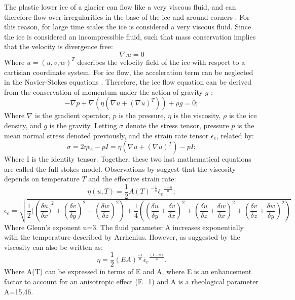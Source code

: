 \documentclass{article}
\begin{document}
The plastic lower ice of a glacier can flow like a very viscous fluid, and can therefore flow over irregularities in the base of the ice and around corners \cite{earle2015physical}. For this reason, for large time scales the ice is considered a very viscous fluid. Since the ice is considered an incompressible fluid, such that mass conservation implies that the velocity is divergence free:
\begin{equation}
	\nabla .u=0
\end{equation}
Where $u=(u,v,w)^T$ describes the velocity field of the ice with respect to a cartisian coordinate system. For ice flow, the acceleration term can be neglected in the Navier-Stokes equations \cite{hutter1982mathematical}. Therefore, the ice flow equation can be derived from the conservation of momentum under the action of gravity $g$ \cite{hutter1982mathematical}:
\begin{equation}
	-\nabla p+\nabla (\eta (\nabla u+(\nabla u)^T))+\rho g = 0;
\end{equation}
Where $\nabla$ is the gradient operator, $p$ is the pressure, $\eta$ is the viscosity, $\rho$ is the ice density, and $g$ is the gravity. Letting $\sigma$ denote the stress tensor, pressure $p$ is the mean normal stress denoted previously, and the strain rate tensor $\epsilon_{e}$, related by:
\begin{equation}
	\sigma=2\eta \epsilon_{e}-pI = \eta (\nabla u+(\nabla u)^T)-pI; 
\end{equation}
Where I is the identity tensor. Together, these two last mathematical equations are called the full-stokes model. Observations by \cite{glen1958flow} suggest that the viscosity depends on temperature $T$ and the effective strain rate:
\begin{equation}
	\eta (u,T)=\frac{1}{2}A(T)^{-\frac{1}{n}}\dot{\epsilon_e}^{\frac{1-n}{n}};
\end{equation}
\begin{equation}
	\dot{\epsilon_e}=\sqrt{\frac{1}{2}(({\frac{\delta u}{\delta x})}^2+{(\frac{\delta v}{\delta y})}^2+{(\frac{\delta w}{\delta z})}^2)+{\frac{1}{4}({(\frac{\delta u}{\delta y}+\frac{\delta v}{\delta x})}^2+{(\frac{\delta u}{\delta z}+\frac{\delta w}{\delta x})}^2+{(\frac{\delta v}{\delta z}+\frac{\delta w}{\delta y})}^2)}}
\end{equation}
Where Glenn's exponent n=3. The fluid parameter A increases exponentially with the temperature described by Arrhenius. However, as suggested by \cite{glen1958flow} the viscosity can also be written as:
\begin{equation}
	\eta = \frac{1}{2}(EA)^\frac{-1}{n} \dot{\epsilon_e}^\frac{(1-n)}{n}.
\end{equation}
Where A(T) can be expressed in terms of E and A, where E is an enhancement factor to account for an anisotropic effect (E=1) and A is a rheological parameter A=15,46. 
\end{document}
